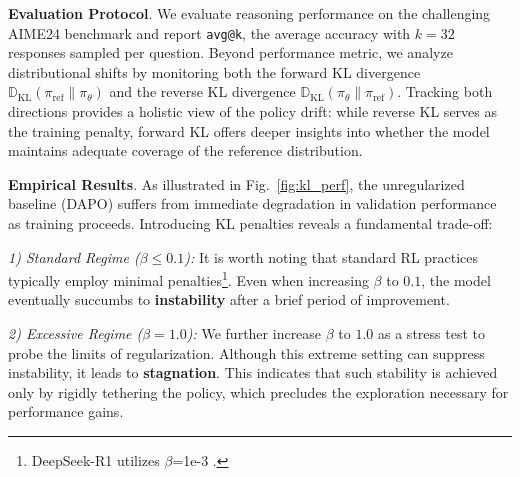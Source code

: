 
\textbf{Evaluation Protocol}.
We evaluate reasoning performance on the challenging AIME24 benchmark and report \texttt{avg@k}, the average accuracy with $k=32$ responses sampled per question.
Beyond performance metric, we analyze distributional shifts by monitoring both the forward KL divergence $\mathbb D_\text{KL}(\pi_\text{ref}\|\pi_\theta)$ and the reverse KL divergence $\mathbb D_\text{KL}(\pi_\theta\|\pi_\text{ref})$.
Tracking both directions provides a holistic view of the policy drift: while reverse KL serves as the training penalty, forward KL offers deeper insights into whether the model maintains adequate coverage of the reference distribution.

\textbf{Empirical Results}.
As illustrated in Fig.~\ref{fig:kl_perf}, the unregularized baseline (DAPO) suffers from immediate degradation in validation performance as training proceeds.
Introducing KL penalties reveals a fundamental trade-off:

\textit{1) Standard Regime ($\beta \le 0.1$):} 
It is worth noting that standard RL practices typically employ minimal penalties\footnote{DeepSeek-R1 utilizes $\beta$=1e-3 \citep{Deepseek-R1}.}.
Even when increasing $\beta$ to $0.1$, the model eventually succumbs to \textbf{instability} after a brief period of improvement.

\textit{2) Excessive Regime ($\beta = 1.0$):} 
We further increase $\beta$ to $1.0$ as a stress test to probe the limits of regularization.
Although this extreme setting can suppress instability, it leads to \textbf{stagnation}.
This indicates that such stability is achieved only by rigidly tethering the policy, which precludes the exploration necessary for performance gains.


